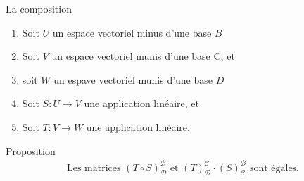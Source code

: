 \begin{parag}{La composition}
    \begin{enumerate}
        \item Soit $U$ un espace vectoriel minus d'une base $B$
        \item Soit $V$ un espace vectoriel munis d'une base C, et
        \item soit $W$ un espave vectoriel munis d'une base $D$
        \item Soit $S : U \to V$ une application linéaire, et
        \item Soit $T : V \to W$ une application linéaire.


    \end{enumerate}
    \begin{subparag}{Proposition}
       \begin{align*}
\text{Les matrices } (T \circ S)_{\mathcal{D}}^{\mathcal{B}} \text{ et } (T)_{\mathcal{D}}^{\mathcal{C}} \cdot (S)_{\mathcal{C}}^{\mathcal{B}} \text{ sont égales.}
\end{align*}


\end{subparag}
\end{parag}
